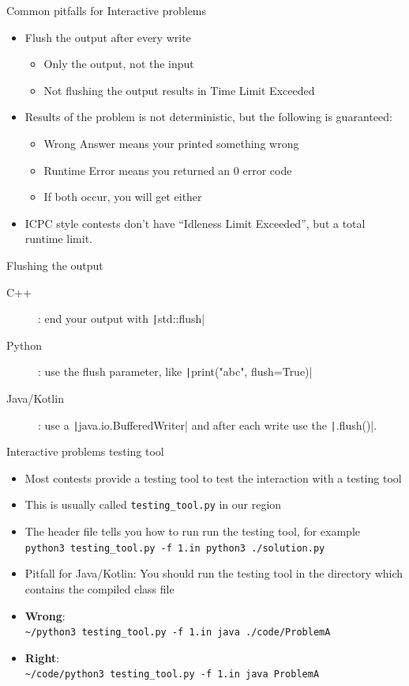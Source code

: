 \documentclass[11pt,pdf, aspectratio=169]{beamer}
\begin{document}
  \begin{frame}{Common pitfalls for Interactive problems}
    \begin{itemize}
      \item Flush the output after every write
      \begin{itemize}
        \item Only the output, not the input
        \item Not flushing the output results in Time Limit Exceeded
      \end{itemize}
      \item Results of the problem is not deterministic, but the following is guaranteed:
      \begin{itemize}
        \item Wrong Answer means your printed something wrong
        \item Runtime Error means you returned an 0 error code
        \item If both occur, you will get either
      \end{itemize}
      \item ICPC style contests don't have ``Idleness Limit Exceeded'', but a total runtime limit.
    \end{itemize}
  \end{frame}
  \begin{frame}{Flushing the output}
    \begin{description}
      \item [C++]: end your output with \texttt|std::flush|
      \item[Python]: use the flush parameter, like \texttt|print("abc", flush=True)|
      \item[Java/Kotlin]: use a \texttt|java.io.BufferedWriter| and after each write use the \texttt|.flush()|.
    \end{description}
  \end{frame}
  \begin{frame}{Interactive problems testing tool}
    \begin{itemize}
      \item Most contests provide a testing tool to test the interaction with a testing tool
      \item This is usually called \texttt{testing\_tool.py} in our region
      \item The header file tells you how to run run the testing tool, for example\\\texttt{\textdollar python3 testing\_tool.py -f 1.in python3 ./solution.py}
      \item Pitfall for Java/Kotlin: You should run the testing tool in the directory which contains the compiled class file

      \item \textbf{Wrong}:\\\texttt{\textasciitilde/\textdollar python3 testing\_tool.py -f 1.in java ./code/ProblemA}
      \item \textbf{Right}:\\\texttt{\textasciitilde/code/\textdollar python3 testing\_tool.py -f 1.in java ProblemA}
    \end{itemize}
  \end{frame}
\end{document}
